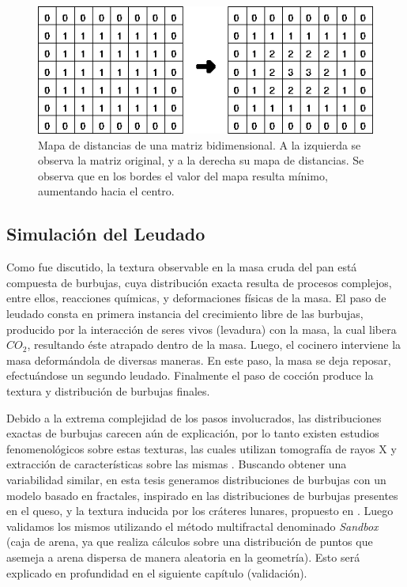 \begin{figure}
\includegraphics[width=13cm]{figures/distance}
\caption[Mapa de distancias de una matriz bidimensional]{Mapa de distancias de una matriz bidimensional. A la izquierda se observa la matriz original, y a la derecha su mapa de distancias. Se observa que en los bordes el valor del mapa resulta mínimo, aumentando hacia el centro.}
\label{fg:distance}
\end{figure}


\subsection{Simulación del Leudado}
\label{breadprov}
Como fue discutido, la textura observable en la masa cruda del pan está compuesta de burbujas, cuya distribución exacta resulta de procesos complejos, entre ellos, reacciones químicas, y deformaciones físicas de la masa.
El paso de leudado consta en primera instancia del crecimiento libre de las burbujas, producido por la interacción de seres vivos (levadura) con la masa, la cual libera $CO_{2}$, resultando éste atrapado dentro de la masa.
Luego, el cocinero interviene la masa deformándola de diversas maneras.
En este paso, la masa se deja reposar, efectuándose un segundo leudado.
Finalmente el paso de cocción produce la textura y distribución de burbujas finales.

Debido a la extrema complejidad de los pasos involucrados, las distribuciones exactas de burbujas carecen aún de explicación, por lo tanto existen estudios fenomenológicos sobre estas texturas, las cuales utilizan tomografía de rayos X y extracción de características sobre las mismas \cite{Babin2006,Gonzales2008,VanDyck2014}.
Buscando obtener una variabilidad similar, en esta tesis generamos distribuciones de burbujas con un modelo basado en fractales, inspirado en las distribuciones de burbujas presentes en el queso, y la textura inducida por los cráteres lunares, propuesto en \cite{Mandelbrot1983}.
Luego validamos los mismos utilizando el método multifractal denominado {\em Sandbox} (caja de arena, ya que realiza cálculos sobre una distribución de puntos que asemeja a arena dispersa de manera aleatoria en la geometría).
Esto será explicado en profundidad en el siguiente capítulo (validación).

